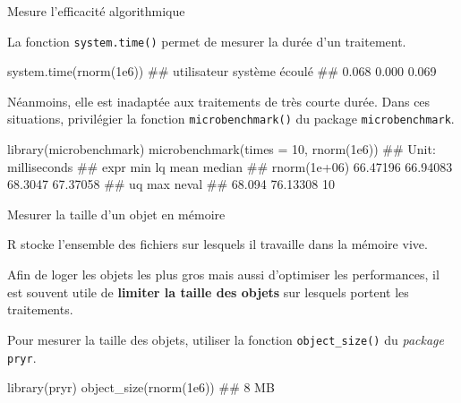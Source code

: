 \documentclass[12pt,handout,ignorenonframetext,]{beamer}
\newenvironment{Shaded}{}{}
\newcommand{\KeywordTok}[1]{\textcolor[rgb]{0.00,0.00,1.00}{{#1}}}
\newcommand{\DataTypeTok}[1]{{#1}}
\newcommand{\DecValTok}[1]{{#1}}
\newcommand{\FloatTok}[1]{{#1}}
\newcommand{\NormalTok}[1]{{#1}}
\renewenvironment{Shaded}{\begin{snugshade}}{\end{snugshade}}
\begin{document}
\begin{frame}[fragile]{Mesure l'efficacité algorithmique}

La fonction \texttt{system.time()} permet de mesurer la durée d'un
traitement.

\footnotesize

\begin{Shaded}
\begin{Highlighting}[]
\KeywordTok{system.time}\NormalTok{(}\KeywordTok{rnorm}\NormalTok{(}\FloatTok{1e6}\NormalTok{))}
  \NormalTok{## utilisateur     système      écoulé }
  \NormalTok{##       0.068       0.000       0.069}
\end{Highlighting}
\end{Shaded}

\pause \normalsize
Néanmoins, elle est inadaptée aux traitements de très courte durée. Dans
ces situations, privilégier la fonction \texttt{microbenchmark()} du
package \texttt{microbenchmark}.

\footnotesize

\begin{Shaded}
\begin{Highlighting}[]
\KeywordTok{library}\NormalTok{(microbenchmark)}
\KeywordTok{microbenchmark}\NormalTok{(}\DataTypeTok{times =} \DecValTok{10}\NormalTok{, }\KeywordTok{rnorm}\NormalTok{(}\FloatTok{1e6}\NormalTok{))}
  \NormalTok{## Unit: milliseconds}
  \NormalTok{##          expr      min       lq    mean   median}
  \NormalTok{##  rnorm(1e+06) 66.47196 66.94083 68.3047 67.37058}
  \NormalTok{##      uq      max neval}
  \NormalTok{##  68.094 76.13308    10}
\end{Highlighting}
\end{Shaded}

\end{frame}

\begin{frame}[fragile]{Mesurer la taille d'un objet en mémoire}

R stocke l'ensemble des fichiers sur lesquels il travaille dans la
mémoire vive.

Afin de loger les objets les plus gros mais aussi d'optimiser les
performances, il est souvent utile de \textbf{limiter la taille des
objets} sur lesquels portent les traitements.

\pause Pour mesurer la taille des objets, utiliser la fonction
\texttt{object\_size()} du \emph{package} \texttt{pryr}.

\begin{Shaded}
\begin{Highlighting}[]
\KeywordTok{library}\NormalTok{(pryr)}
\KeywordTok{object_size}\NormalTok{(}\KeywordTok{rnorm}\NormalTok{(}\FloatTok{1e6}\NormalTok{))}
  \NormalTok{## 8 MB}
\end{Highlighting}
\end{Shaded}

\end{frame}
\end{document}
